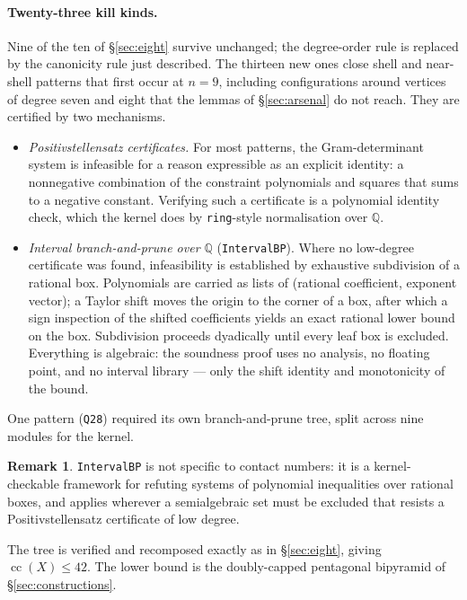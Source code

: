 \documentclass[11pt,a4paper]{article}
\theoremstyle{plain}
\theoremstyle{definition}
\newtheorem{remark}[theorem]{Remark}
\begin{document}
\paragraph{Twenty-three kill kinds.} Nine of the ten of \S\ref{sec:eight} survive
unchanged; the degree-order rule is replaced by the canonicity rule just described. The
thirteen new ones
close shell and near-shell patterns that first occur at $n=9$, including configurations
around vertices of degree seven and eight that the lemmas of \S\ref{sec:arsenal} do not
reach. They are certified by two mechanisms.

\begin{itemize}[leftmargin=*]
\item \emph{Positivstellensatz certificates.} For most patterns, the Gram-determinant
  system is infeasible for a reason expressible as an explicit identity: a nonnegative
  combination of the constraint polynomials and squares that sums to a negative
  constant. Verifying such a certificate is a polynomial identity check, which the
  kernel does by \texttt{ring}-style normalisation over $\mathbb{Q}$.
\item \emph{Interval branch-and-prune over $\mathbb{Q}$} (\texttt{IntervalBP}). Where no
  low-degree certificate was found, infeasibility is established by exhaustive
  subdivision of a rational box. Polynomials are carried as lists of
  (rational coefficient, exponent vector); a Taylor shift moves the origin to the corner
  of a box, after which a sign inspection of the shifted coefficients yields an exact
  rational lower bound on the box. Subdivision proceeds dyadically until every leaf box
  is excluded. Everything is algebraic: the soundness proof uses no analysis, no
  floating point, and no interval library --- only the shift identity and monotonicity
  of the bound.
\end{itemize}

One pattern (\texttt{Q28}) required its own branch-and-prune tree, split across nine
modules for the kernel.

\begin{remark}
\texttt{IntervalBP} is not specific to contact numbers: it is a kernel-checkable
framework for refuting systems of polynomial inequalities over rational boxes, and
applies wherever a semialgebraic set must be excluded that resists a
Positivstellensatz certificate of low degree.
\end{remark}

The tree is verified and recomposed exactly as in \S\ref{sec:eight}, giving
$\operatorname{cc}(X) \le 42$. The lower bound is the doubly-capped pentagonal bipyramid
of \S\ref{sec:constructions}.
\end{document}
